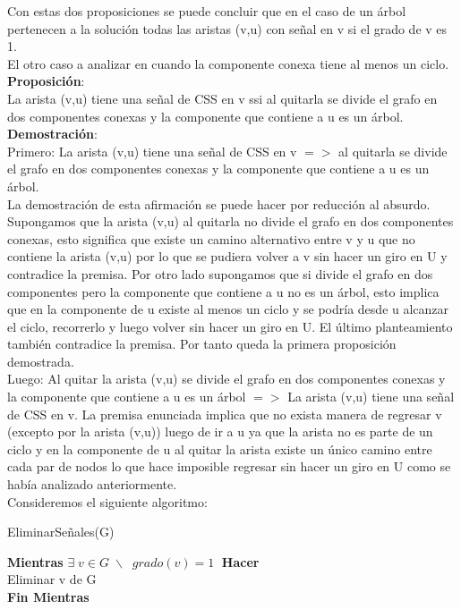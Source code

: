 \documentclass{report}
\begin{document}
Con estas dos proposiciones se puede concluir que en el caso de un \'arbol pertenecen a la soluci\'on todas las aristas (v,u) con se\~nal en v si el grado de v es 1.\\
El otro caso a analizar en cuando la componente conexa tiene al menos un ciclo.\\ 
{\bf Proposici\'on}:\\
La arista (v,u) tiene una se\~nal de CSS en v ssi al quitarla se divide el grafo en dos componentes conexas y la componente que contiene a u es un \'arbol.\\
{\bf Demostraci\'on}:\\
Primero: La arista (v,u) tiene una se\~nal de CSS en v $=>$ al quitarla se divide el grafo en dos componentes conexas y la componente que contiene a u es un \'arbol. 
\\La demostraci\'on de esta afirmaci\'on se puede hacer por reducci\'on al absurdo. Supongamos que la arista (v,u) al quitarla no divide el grafo en dos componentes conexas, esto significa que existe un camino alternativo entre v y u que no contiene la arista (v,u) por lo que se pudiera volver a v sin hacer un giro en U y contradice la premisa. Por otro lado supongamos que si divide el grafo en dos componentes pero la componente que contiene a u no es un \'arbol, esto implica que en la componente de u existe al menos un ciclo y se podr\'ia desde u alcanzar el ciclo, recorrerlo y luego volver sin hacer un giro en U. El \'ultimo planteamiento tambi\'en contradice la premisa. Por tanto queda la primera proposici\'on demostrada.\\
Luego: Al quitar la arista (v,u) se divide el grafo en dos componentes conexas y la componente que contiene a u es un \'arbol $=>$ La arista (v,u) tiene una se\~nal de CSS en v. La premisa enunciada implica que no exista manera de regresar v (excepto por la arista (v,u)) luego de ir a u ya que la arista no es parte de un ciclo y en la componente de u al quitar la arista existe un \'unico camino entre cada par de nodos lo que hace imposible regresar sin hacer un giro en U como se hab\'ia analizado anteriormente.\\
Consideremos el siguiente algoritmo:\\
\begin{algorithm}[H] %
	\caption{EliminarSe\~nales(G)}\label{ML:Algorithm4}
	\SetAlgoLined
	\LinesNumbered
	\SetAlgoVlined
	{\bf Mientras} $\exists \;v\in G \;\backslash \;\; grado(v) = 1\;$ {\bf Hacer}\\
	\hspace{0,5cm} Eliminar v de G\\
	{\bf Fin Mientras}\\	
\end{algorithm}
\end{document}
